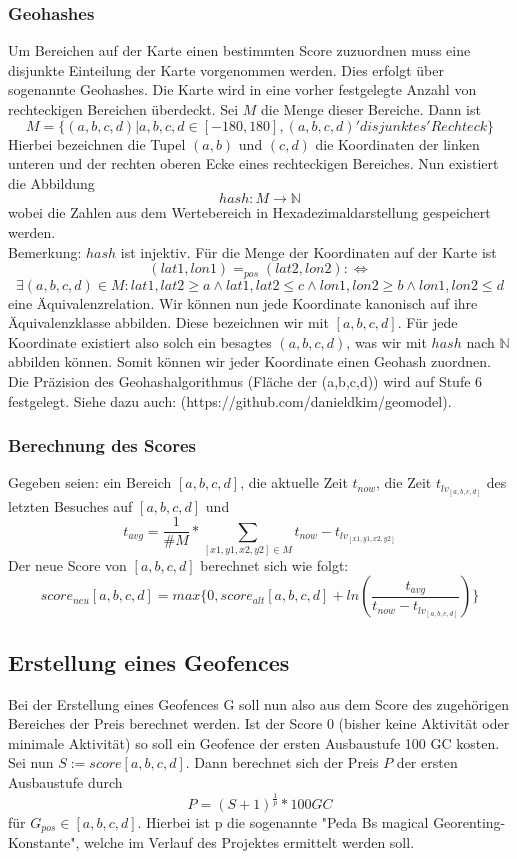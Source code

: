 \documentclass{scrreprt}
\begin{document}
\subsubsection{Geohashes}
Um Bereichen auf der Karte einen bestimmten Score zuzuordnen muss eine disjunkte Einteilung der Karte vorgenommen werden. Dies erfolgt über sogenannte Geohashes. Die Karte wird in eine vorher festgelegte Anzahl von rechteckigen Bereichen überdeckt. Sei $M$ die Menge dieser Bereiche. Dann ist \[ M = \{(a,b,c,d) | a,b,c,d \in [-180,180], (a,b,c,d)  'disjunktes' Rechteck\} \] Hierbei bezeichnen die Tupel $(a,b)$ und $(c,d)$ die Koordinaten der linken unteren und der rechten oberen Ecke eines rechteckigen Bereiches. Nun existiert die Abbildung \[ hash: M \rightarrow \mathbb{N}\] wobei die Zahlen aus dem Wertebereich in Hexadezimaldarstellung gespeichert werden.\\ Bemerkung: $hash$ ist injektiv. Für die Menge der Koordinaten auf der Karte ist \[(lat1,lon1) =_{pos} (lat2,lon2) :\Leftrightarrow\] \[ \exists (a,b,c,d) \in M: lat1, lat2 \ge a \land lat1,lat2 \le c \land  lon1, lon2 \ge b \land lon1,lon2 \le d\] eine Äquivalenzrelation.
Wir können nun jede Koordinate kanonisch auf ihre Äquivalenzklasse abbilden. Diese bezeichnen wir mit $[a,b,c,d]$. Für jede Koordinate existiert also solch ein besagtes $(a,b,c,d)$, was wir mit $hash$ nach $\mathbb{N}$ abbilden können. Somit können wir jeder Koordinate einen Geohash zuordnen. 
Die Präzision des Geohashalgorithmus (Fläche der (a,b,c,d)) wird auf Stufe 6 festgelegt. Siehe dazu auch: (https://github.com/danieldkim/geomodel). 
\subsubsection{Berechnung des Scores}
Gegeben seien: ein Bereich $[a,b,c,d]$, die aktuelle Zeit $t_{now}$, die Zeit $t_{lv_{ [a,b,c,d]}}$ des letzten Besuches auf $[a,b,c,d]$ und  \[t_{avg} = \frac{1}{\#M} * \sum_{[x1,y1,x2,y2] \in M} t_{now} - t_{lv_{ [x1,y1,x2,y2]}}\] Der neue Score von $[a,b,c,d]$ berechnet sich wie folgt:
\[score_{neu}[a,b,c,d] = max\{0, score_{alt}[a,b,c,d] + ln(\frac{t_{avg}}{t_{now}-t_{lv_{ [a,b,c,d]}}})\}\]
\subsection{Erstellung eines Geofences}
Bei der Erstellung eines Geofences G soll nun also aus dem Score des zugehörigen Bereiches der Preis berechnet werden. Ist der Score 0 (bisher keine Aktivität oder minimale Aktivität) so soll ein Geofence der ersten Ausbaustufe 100 GC kosten. Sei nun $S := score [a,b,c,d]$. Dann berechnet sich der Preis $P$ der ersten Ausbaustufe durch \[P = (S+1)^{\frac{1}{p}} * 100 GC\] für $G_{pos} \in [a,b,c,d]$. Hierbei ist p die sogenannte "Peda Bs magical Georenting-Konstante", welche im Verlauf des Projektes ermittelt werden soll.
 
\end{document}
